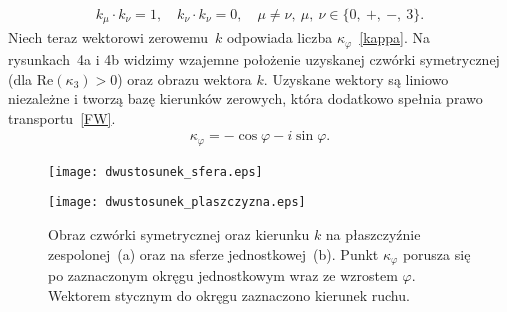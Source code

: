 \begin{align*}
k_\mu \cdot k_\nu = 1 , 
\quad k_\nu \cdot k_\nu = 0,\quad \mu \neq \nu ,\ 
\mu,\ \nu \in \{0,\ +,\ -,\ 3\}.
\end{align*} 
Niech teraz wektorowi zerowemu~$k$ odpowiada 
liczba $\kappa_\varphi$~\eqref{kappa}.
Na rysunkach~4a i 4b
widzimy wzajemne położenie 
uzyskanej czwórki symetrycznej (dla Re$ (\kappa_3) >0$) 
oraz obrazu wektora $k$. 
Uzyskane wektory są liniowo niezależne i tworzą bazę 
kierunków zerowych, która dodatkowo spełnia 
prawo transportu~\eqref{FW}.
\begin{align}\label{kappa}
\kappa_\varphi = -\cos\varphi - i \sin \varphi .
\end{align}
\begin{figure}[h]
\begin{minipage}[b]{.5\linewidth}
\centering
\texttt{[image: dwustosunek\_sfera.eps]}
\subcaption{}
\end{minipage}%
\begin{minipage}[b]{.5\linewidth}
\centering
\texttt{[image: dwustosunek\_plaszczyzna.eps]}
\subcaption{}
\end{minipage}
\caption{Obraz czwórki symetrycznej oraz kierunku $k$ na płaszczyźnie 
zespolonej~(a) oraz na sferze jednostkowej~(b).
Punkt $\kappa_\varphi$ porusza się po zaznaczonym okręgu jednostkowym 
wraz ze wzrostem $\varphi$. Wektorem stycznym do okręgu zaznaczono 
kierunek ruchu.}
\label{dwustosunek_plaszczyzna}
\end{figure}
\\

